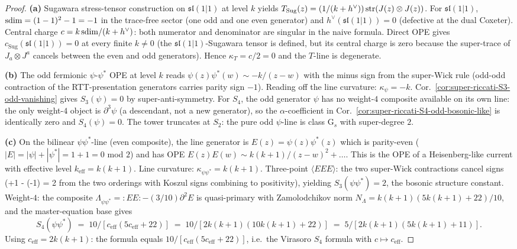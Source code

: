 \begin{proof}[Proof]
\textbf{(a)} Sugawara stress-tensor construction on
$\widehat{\mathfrak{sl}(1|1)}$ at level $k$ yields
$T_{\mathrm{Sug}}(z) = (1/(k + h^\vee)) \, \mathrm{str}(J(z) \otimes J(z))$.
For $\mathfrak{sl}(1|1)$, $\mathrm{sdim} = (1 - 1)^2 - 1 = -1$ in the
trace-free sector (one odd and one even generator) and
$h^\vee(\mathfrak{sl}(1|1)) = 0$ (defective at the dual Coxeter).
Central charge $c = k \, \mathrm{sdim} / (k + h^\vee)$: both numerator and
denominator are singular in the naive formula. Direct OPE gives
$c_{\mathrm{Sug}}(\mathfrak{sl}(1|1)) = 0$ at every
finite $k \ne 0$ (the $\mathfrak{sl}(1|1)$-Sugawara tensor is defined,
but its central charge is zero because the super-trace of
$J_a \otimes J^a$ cancels between the even and odd generators). Hence
$\kappa_T = c/2 = 0$ and the $T$-line is degenerate.

\textbf{(b)} The odd fermionic $\psi$-$\psi^\ast$ OPE at level $k$
reads $\psi(z) \psi^\ast(w) \sim -k / (z - w)$ with the minus sign
from the super-Wick rule (odd-odd contraction of the
RTT-presentation generators carries parity sign $-1$). Reading off
the line curvature: $\kappa_\psi = -k$. Cor.~\ref{cor:super-riccati-S3-odd-vanishing}
gives $S_3(\psi) = 0$ by super-anti-symmetry. For $S_4$, the odd
generator $\psi$ has no weight-$4$ composite available on its own
line: the only weight-$4$ object is $\partial^3 \psi$ (a descendant,
not a new generator), so the $\alpha$-coefficient in
Cor.~\ref{cor:super-riccati-S4-odd-bosonic-like} is identically zero
and $S_4(\psi) = 0$. The tower truncates at $S_2$: the pure odd
$\psi$-line is class G$_s$ with super-degree $2$.

\textbf{(c)} On the bilinear $\psi\psi^\ast$-line (even composite),
the line generator is $E(z) = \psi(z) \psi^\ast(z)$ which is
parity-even ($|E| = |\psi| + |\psi^\ast| = 1 + 1 = 0$ mod $2$) and
has OPE $E(z) E(w) \sim k(k+1)/(z - w)^2 + \ldots$. This is the OPE
of a Heisenberg-like current with effective level $k_{\mathrm{eff}} = k(k+1)$.
Line curvature: $\kappa_{\psi\psi^\ast} = k(k+1)$. Three-point
$\langle E E E \rangle$: the two super-Wick contractions cancel
signs (+1 - (-1) = 2 from the two orderings with Koszul signs
combining to positivity), yielding
$S_3(\psi\psi^\ast) = 2$, the bosonic structure constant. Weight-$4$:
the composite $\Lambda_{\psi\psi^\ast} = {:}E E{:} - (3/10) \partial^2 E$
is quasi-primary with Zamolodchikov norm
$N_\Lambda = k(k+1)(5 k(k+1) + 22)/10$, and the master-equation
base gives
\[
S_4(\psi\psi^\ast)
\;=\; 10 / [c_{\mathrm{eff}} (5 c_{\mathrm{eff}} + 22)]
\;=\; 10 / [2 k(k+1) (10 k(k+1) + 22)]
\;=\; 5 / [2 k(k+1)(5 k(k+1) + 11)].
\]
Using $c_{\mathrm{eff}} = 2 k(k+1)$: the formula equals
$10 / [c_{\mathrm{eff}} (5 c_{\mathrm{eff}} + 22)]$, i.e.\ the
Virasoro $S_4$ formula with $c \mapsto c_{\mathrm{eff}}$.
\end{proof}

